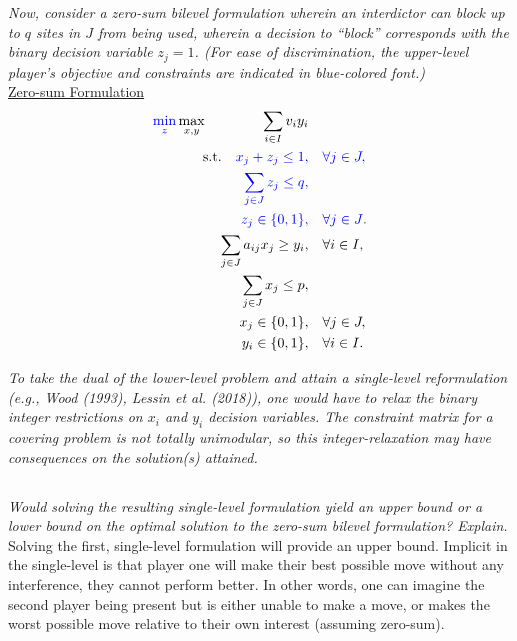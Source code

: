 \documentclass[12pt]{amsart}
\begin{document}
\begin{center}
\begin{minipage}{0.75\linewidth}
		
\textit{Now, consider a zero-sum bilevel formulation wherein an interdictor can block up to $q$ sites
	in $J$ from being used, wherein a decision to “block” corresponds with the binary decision
	variable $z_j = 1$. (For ease of discrimination, the upper-level player’s objective and
	constraints are indicated in {\color{blue} blue-colored font}.)} \\
	
	\underline{Zero-sum Formulation}
	\begin{align*}
		{\color{blue}\min_z}\max_{x,y} \qquad\qquad \sum_{i\in I} v_iy_i& \\
		\text{s.t.}\quad
		{\color{blue} x_j+z_j \leq 1,}& \quad {\color{blue}\forall j\in J,}\\
		{\color{blue} \sum_{j\in J}z_j\leq q,}&  \\
		{\color{blue} z_j\in \{0,1\},}& {\color{blue}\quad\forall j\in J}.  \\
		\sum_{j\in J} a_{ij}x_j \geq y_i,& \quad \forall i\in I, \\
		\sum_{j\in J} x_j \leq p,& \\
		x_j \in \{0,1\},& \quad \forall j\in J, \\
		y_i \in \{0,1\},& \quad \forall i\in I.
	\end{align*}
	
\textit{To take the dual of the lower-level problem and attain a single-level reformulation (e.g.,
	Wood (1993), Lessin et al. (2018)), one would have to relax the binary integer restrictions
	on $x_i$ and $y_i$ decision variables. The constraint matrix for a covering problem is not totally
	unimodular, so this integer-relaxation may have consequences on the solution(s) attained.} \\

\end{minipage}
\end{center}		

\subsection{}
\textit{Would solving the resulting single-level formulation yield an upper bound or a lower bound
on the optimal solution to the zero-sum bilevel formulation? Explain.} \\

Solving the first, single-level formulation will provide an upper bound. 
Implicit in the single-level is that player one will make their best
possible move without any interference, they cannot perform better.
In other words, one can imagine the second player being present but is either unable to make a move, 
or makes the worst possible move relative to their own interest (assuming zero-sum).
\end{document}
